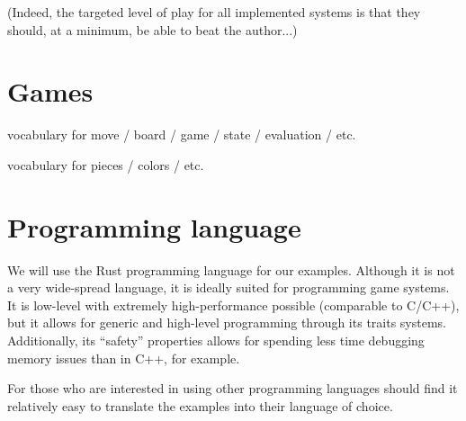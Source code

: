 \documentclass[10pt,dvipdfmx,letterpaper]{report}
\begin{document}
(Indeed, the targeted level of play for all implemented systems is that they should, at a minimum,
be able to beat the author...)

\section{Games}

vocabulary for move / board / game / state / evaluation / etc.

vocabulary for pieces / colors / etc.

\section{Programming language}

We will use the Rust programming language for our examples.
Although it is not a very wide-spread language, it is ideally suited for
programming game systems.  It is low-level with extremely high-performance possible (comparable to C/C++),
but it allows for generic and high-level programming through its traits systems.  Additionally, its ``safety''
properties allows for spending less time debugging memory issues than in C++, for example.

For those who are interested in using other programming languages should find it relatively easy to translate
the examples into their language of choice.

\makeatletter
\newcount\ttt@x
\newcount\ttt@y
\newcommand{\ttt@putrow}[1]{\@for\tmp:=#1\do{\put(\ttt@x,\ttt@y){\makebox(5,5){\tmp}}\advance\ttt@x by 5}}
\newcommand{\tictactoeboard}[3]{{
\setlength{\unitlength}{1mm}
\begin{picture}(15,15)(0,0)
\thicklines
\put(0,5){\line(1,0){15}}
\put(0,10){\line(1,0){15}}
\put(5,0){\line(0,1){15}}
\put(10,0){\line(0,1){15}}
\ttt@x=0\ttt@y=10\ttt@putrow{#1}
\ttt@x=0\ttt@y=5\ttt@putrow{#2}
\ttt@x=0\ttt@y=0\ttt@putrow{#3}
\end{picture}
}}
\makeatother
\end{document}
